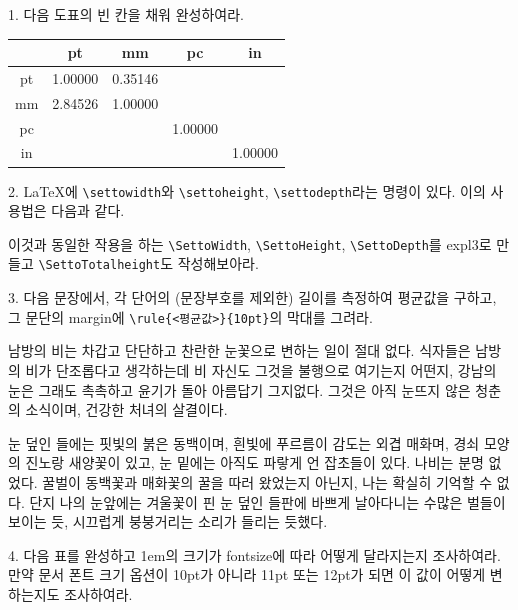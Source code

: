 \documentclass[a4paper,amsmath]{oblivoir}
\begin{document}
\begin{questionp}
 1. 다음 도표의 빈 칸을 채워 완성하여라.
\begin{tabular}{c|c|c|c|c}
   & pt & mm & pc & in \\ \hline
pt &  1.00000  & 0.35146  &	  &  \\ \hline
mm & 2.84526  & 1.00000   &	  &  \\  \hline
pc &    &    & 1.00000	  &  \\ \hline
in &    &    &	  & 1.00000 \\ \hline
\end{tabular}

\bigskip

 2. \LaTeX 에 \verb|\settowidth|와 \verb|\settoheight|, \verb|\settodepth|라는 명령이 있다. 이의 사용법은 다음과 같다.

\begin{exampleside}
\newlength{\mylen}
\settowidth{\mylen}{beautiful}
\the\mylen
\end{exampleside}

이것과 동일한 작용을 하는 \verb|\SettoWidth|, \verb|\SettoHeight|, \verb|\SettoDepth|를 expl3로 만들고 \verb|\SettoTotalheight|도 작성해보아라. 

\bigskip

 3. 다음 문장에서, 각 단어의 (문장부호를 제외한) 길이를 측정하여 평균값을 구하고, 그 문단의 margin에 \verb|\rule{<평균값>}{10pt}|의 막대를 그려라.

\begin{framed}
남방의 비는 차갑고 단단하고 찬란한 눈꽃으로 변하는 일이 절대 없다. 식자들은 남방의 비가 단조롭다고 생각하는데 비 자신도 그것을 불행으로 여기는지 어떤지, 강남의 눈은 그래도 촉촉하고 윤기가 돌아 아름답기 그지없다. 그것은 아직 눈뜨지 않은 청춘의 소식이며, 건강한 처녀의 살결이다. 

눈 덮인 들에는 핏빛의 붉은 동백이며, 흰빛에 푸르름이 감도는 외겹 매화며, 경쇠 모양의 진노랑 새양꽃이 있고, 눈 밑에는 아직도 파랗게 언 잡초들이 있다. 나비는 분명 없었다. 꿀벌이 동백꽃과 매화꽃의 꿀을 따러 왔었는지 아닌지, 나는 확실히 기억할 수 없다. 단지 나의 눈앞에는 겨울꽃이 핀 눈 덮인 들판에 바쁘게 날아다니는 수많은 벌들이 보이는 듯, 시끄럽게 붕붕거리는 소리가 들리는 듯했다.
\end{framed}



\bigskip

 4. 다음 표를 완성하고 1em의 크기가 fontsize에 따라 어떻게 달라지는지 조사하여라. 만약 문서 폰트 크기 옵션이 10pt가 아니라 11pt 또는 12pt가 되면 이 값이 어떻게 변하는지도 조사하여라.


\end{questionp}
\end{document}
